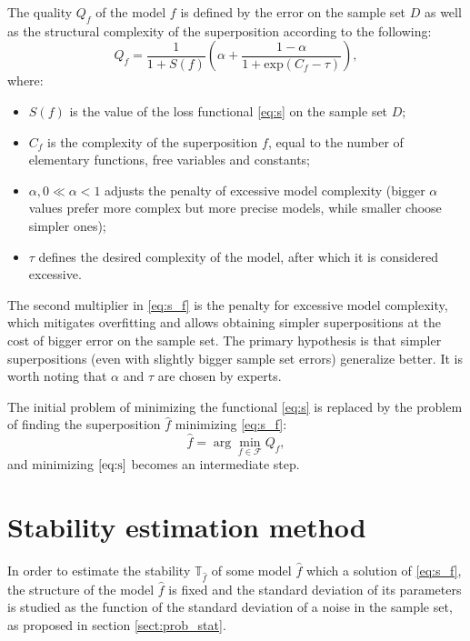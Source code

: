 \documentclass[11pt,a4paper]{article}
\theoremstyle{definition}
\begin{document}
The quality $Q_f$ of the model $f$ is defined by the error on the sample
set $D$ as well as the structural complexity of the superposition according to the
following:
\begin{equation}
  Q_f = \frac{1}{1 + S(f)} \left(\alpha + \frac{1 - \alpha}{1 + \text{exp} (C_f - \tau)}\right),
  \label{eq:s_f}
\end{equation}
where:
\begin{itemize}
  \item[] $S(f)$ is the value of the loss functional \eqref{eq:s} on the sample set $D$;
  \item[] $C_f$ is the complexity of the superposition $f$, equal to the number of
	elementary functions, free variables and constants;
  \item[] $\alpha, 0 \ll \alpha < 1$ adjusts the penalty of excessive model complexity
	(bigger $\alpha$ values prefer more complex but more precise models, while smaller
	choose simpler ones);
  \item[] $\tau$ defines the desired complexity of the model, after which it is considered
	excessive.
\end{itemize}

The second multiplier in \eqref{eq:s_f} is the penalty for excessive model complexity,
which mitigates overfitting and allows obtaining simpler superpositions at the cost of
bigger error on the sample set. The primary hypothesis is that simpler superpositions
(even with slightly bigger sample set errors) generalize better. It is worth noting that
$\alpha$ and $\tau$ are chosen by experts.

The initial problem of minimizing the functional \eqref{eq:s} is replaced by
the problem of finding the superposition $\hat{f}$ minimizing \eqref{eq:s_f}:
\begin{equation}
  \hat{f} = \arg \min_{f \in \mathcal{F}} Q_f,
  \label{eq:s_f_min}
\end{equation}
and minimizing $\eqref{eq:s}$ becomes an intermediate step.

\section{Stability estimation method}

In order to estimate the stability $\mathbb{T}_{\hat{f}}$ of some model $\hat{f}$
which a solution of \eqref{eq:s_f}, the structure of the model $\hat{f}$ is fixed
and the standard deviation of its parameters is studied as the function of the
standard deviation of a noise in the sample set, as proposed in section
\ref{sect:prob_stat}.
\end{document}
